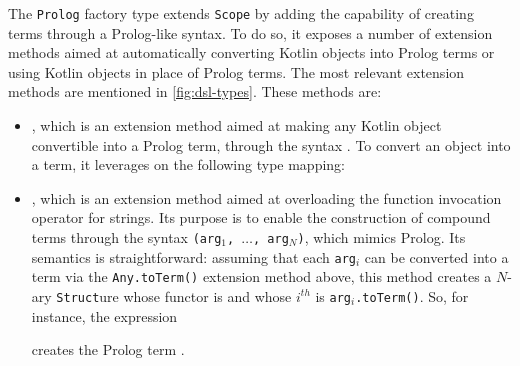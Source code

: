 \documentclass[12pt,a4paper,openright,twoside]{book}
\begin{document}
The \texttt{Prolog} factory type extends \texttt{Scope} by adding the capability of creating terms through a Prolog-like syntax.
%
To do so, it exposes a number of extension methods aimed at automatically converting Kotlin objects into Prolog terms or using Kotlin objects in place of Prolog terms.
%
The most relevant extension methods are mentioned in \cref{fig:dsl-types}.
%
These methods are:
%
\begin{itemize}
    \item {}, which is an extension method aimed at making any Kotlin object convertible into a Prolog term, through the syntax .
    To convert an object into a term, it leverages on the following type mapping:

    \item {},
    which is an extension method aimed at overloading the function invocation operator for strings.
    Its purpose is to enable the construction of compound terms through the syntax \texttt{(arg$_1$, $\ldots$, arg$_N$)}, which mimics Prolog.
    Its semantics is straightforward: assuming that each \texttt{arg}$_i$ can be converted into a term via the \texttt{Any.toTerm()} extension method above, this method creates a $N$-ary \texttt{Struct}ure whose functor is  and whose $i^{th}$ is \texttt{arg$_i$.toTerm()}.
    So, for instance, the expression
    \begin{center}
    \end{center}
    creates the Prolog term .


\end{itemize}
\end{document}
